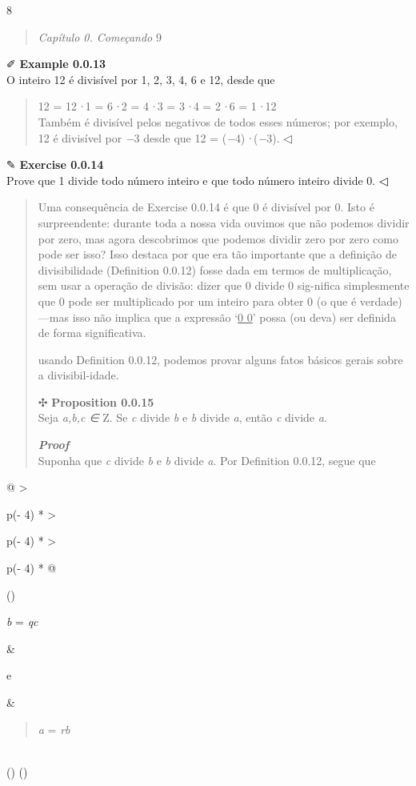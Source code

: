 \documentclass[
]{article}
\begin{document}
8

\begin{quote}
\emph{Capítulo 0. Começando} 9
\end{quote}

✐ \textbf{Example 0.0.13}\\
O inteiro 12 é divisível por 1, 2, 3, 4, 6 e 12, desde que

\begin{quote}
12 = 12\emph{·}1 = 6\emph{·}2 = 4\emph{·}3 = 3\emph{·}4 = 2\emph{·}6 =
1\emph{·}12\\
Também é divisível pelos negativos de todos esses números; por exemplo,
12 é divisível por \emph{−}3 desde que 12 =
(\emph{−}4)\emph{·}(\emph{−}3). ◁
\end{quote}

✎ \textbf{Exercise 0.0.14}\\
Prove que 1 divide todo número inteiro e que todo número inteiro divide
0. ◁

\begin{quote}
Uma consequência de Exercise 0.0.14 é que 0 é divisível por 0. Isto é
surpreendente: durante toda a nossa vida ouvimos que não podemos dividir
por zero, mas agora descobrimos que podemos dividir zero por zero como
pode ser isso? Isso destaca por que era tão importante que a definição
de divisibilidade (Definition 0.0.12) fosse dada em termos de
multiplicação, sem usar a operação de divisão: dizer que 0 divide 0
sig-nifica simplesmente que 0 pode ser multiplicado por um inteiro para
obter 0 (o que é verdade)---mas isso não implica que a expressão
`\uline{0 0}' possa (ou deva) ser definida de forma significativa.

usando Definition 0.0.12, podemos provar alguns fatos básicos gerais
sobre a divisibil-idade.

✣ \textbf{Proposition 0.0.15}\\
Seja \emph{a,b,c ∈} Z. Se \emph{c} divide \emph{b} e \emph{b} divide
\emph{a}, então \emph{c} divide \emph{a}.

\emph{\textbf{Proof}}\\
Suponha que \emph{c} divide \emph{b} e \emph{b} divide \emph{a}. Por
Definition 0.0.12, segue que
\end{quote}

\begin{longtable}[]{@{}
  >{\raggedright\arraybackslash}p{(\columnwidth - 4\tabcolsep) * }
  >{\raggedright\arraybackslash}p{(\columnwidth - 4\tabcolsep) * }
  >{\raggedright\arraybackslash}p{(\columnwidth - 4\tabcolsep) * }@{}}
\toprule()
\begin{minipage}[b]{\linewidth}\raggedright
\emph{b} = \emph{qc}
\end{minipage} & \begin{minipage}[b]{\linewidth}\raggedright
e
\end{minipage} & \begin{minipage}[b]{\linewidth}\raggedright
\begin{quote}
\emph{a} = \emph{rb}
\end{quote}
\end{minipage} \\
\midrule()
\endhead
\bottomrule()
\end{longtable}
\end{document}
